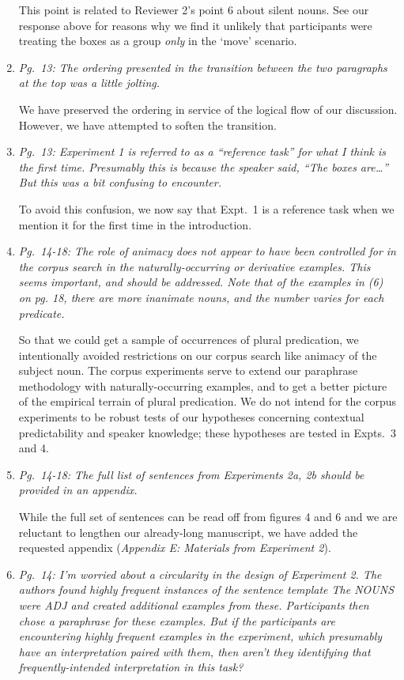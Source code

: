 \documentclass[12pt]{article}
\begin{document}
\begin{enumerate}
This point is related to Reviewer 2's point 6 about silent nouns. See our response above for reasons why we find it unlikely that participants were treating the boxes as a group \emph{only} in the `move' scenario.

\item \emph{Pg.~13: The ordering presented in the transition between the two paragraphs at the top was a little jolting.} 
	
We have preserved the ordering in service of the logical flow of our discussion. However, we have attempted to soften the transition.
	
\item \emph{Pg.~13: Experiment 1 is referred to as a ``reference task'' for what I think is the first time. Presumably this is because the speaker said, ``The boxes are\ldots'' But this was a bit confusing to encounter.}

To avoid this confusion, we now say that Expt.~1 is a reference task when we mention it for the first time in the introduction.

\item \emph{Pg.~14-18: The role of animacy does not appear to have been controlled for in the corpus search in the naturally-occurring or derivative examples. This seems important, and should be addressed. Note that of the examples in (6) on pg. 18, there are more inanimate nouns, and the number varies for each predicate.}

So that we could get a sample of occurrences of plural predication, we intentionally avoided restrictions on our corpus search like animacy of the subject noun. The corpus experiments serve to extend our paraphrase methodology with naturally-occurring examples, and to get a better picture of the empirical terrain of plural predication. We do not intend for the corpus experiments to be robust tests of our hypotheses concerning contextual predictability and speaker knowledge; these hypotheses are tested in Expts.~3 and 4.

\item \emph{Pg.~14-18: The full list of sentences from Experiments 2a, 2b should be provided in an appendix.}

While the full set of sentences can be read off from figures 4 and 6 and we are reluctant to lengthen our already-long manuscript, we have added the requested appendix (\emph{Appendix E: Materials from Experiment 2}).

\item \emph{Pg.~14: I'm worried about a circularity in the design of Experiment 2. The authors found highly frequent instances of the sentence template \emph{The NOUNS were ADJ} and created additional examples from these. Participants then chose a paraphrase for these examples. But if the participants are encountering highly frequent examples in the experiment, which presumably have an interpretation paired with them, then aren't they identifying that frequently-intended interpretation in this task?}


\end{enumerate}
\end{document}
